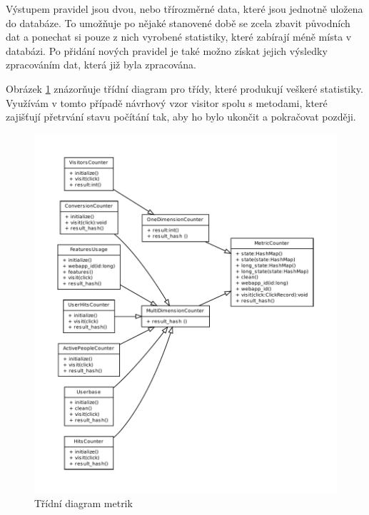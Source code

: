 \documentclass[bc,male,java,dept456]{diploma}						%
\begin{document}
Výstupem pravidel jsou dvou, nebo třírozměrné data, které jsou jednotně uložena do databáze. To umožňuje po nějaké stanovené době se zcela zbavit původních dat a ponechat si pouze z nich vyrobené statistiky, které zabírají méně místa v databázi. Po přidání nových pravidel je také možno získat jejich výsledky zpracováním dat, která již byla zpracována.

Obrázek \ref{img:metric_counter} znázorňuje třídní diagram pro třídy, které produkují veškeré statistiky. Využívám v tomto případě návrhový vzor visitor spolu s metodami, které zajišťují přetrvání stavu počítání tak, aby ho bylo ukončit a pokračovat později.


\begin{figure}[h]
	\includegraphics[width=15.25cm]{img/code/MetricCounter.pdf}
	\caption{Třídní diagram metrik}
	\label{img:metric_counter}
\end{figure}
\end{document}

